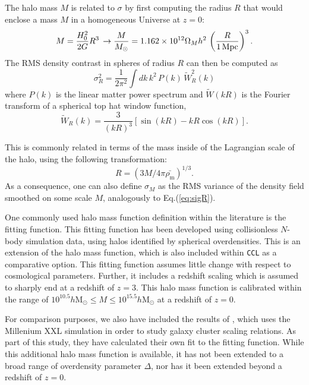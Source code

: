\documentclass[\docopts]{\docclass}
\newcommand{\ccl}{{\tt CCL}\xspace}
\begin{document}
The halo mass $M$ is related to $\sigma$ by first computing the radius $R$ that would enclose a mass $M$ in a homogeneous Universe at $z=0$:
\begin{equation}
  M=\frac{H_0^2}{2G}R^3\,\rightarrow \frac{M}{M_\odot}=1.162\times10^{12}\Omega_Mh^2\,\left(\frac{R}{1\,{\rm Mpc}}\right)^3.
\end{equation}
The RMS density contrast in spheres of radius $R$ can then be computed as
\begin{equation}
  \sigma_R^2 = \frac{1}{2\pi^2}\int dk\,k^2\,P(k)\,\tilde{W}_R^2(k)
  \label{eq:sigR}
\end{equation}
where $P(k)$ is the linear matter power spectrum and $\tilde{W}(kR)$ is the Fourier transform of a spherical top hat window function,
\begin{equation}
\tilde{W}_R(k) = \frac{3}{(kR)^3}[\sin(kR)-kR\cos(kR)].
\end{equation}

This is commonly related in terms of the mass inside of the Lagrangian scale of the halo, using the following transformation:
\begin{equation}
R = (3M/4\pi\bar{\rho_{\mathrm{m}}})^{1/3}.
\end{equation}
As a consequence, one can also define $\sigma_M$ as the RMS variance of the density field smoothed on some scale $M$, analogously to Eq.(\ref{eq:sigR}).

One commonly used halo mass function definition within the literature is the \citet{Tinker2010} fitting function. This fitting function has been developed using collisionless $N$-body simulation data, using halos identified by spherical overdensities. This is an extension of the \citet{Tinker2008} halo mass function, which is also included within \ccl as a comparative option. This fitting function assumes little change with respect to cosmological parameters. Further, it includes a redshift scaling which is assumed to sharply end at a redshift of $z = 3$. This halo mass function is calibrated within the range of $10^{10.5} h\mathrm{M}_\odot \leq M \leq 10^{15.5} h\mathrm{M}_\odot$ at a redshift of $z = 0$.

For comparison purposes, we also have included the results of \citet{Angulo2012}, which uses the Millenium XXL simulation in order to study galaxy cluster scaling relations. As part of this study, they have calculated their own fit to the \citet{Tinker2010} fitting function. While this additional halo mass function is available, it has not been extended to a broad range of overdensity parameter $\Delta$, nor has it been extended beyond a redshift of $z = 0$.
\end{document}
